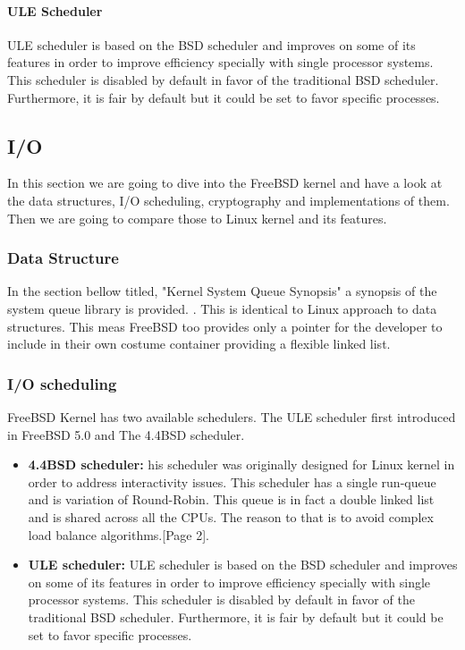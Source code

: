 \documentclass[journal,10pt,onecolumn,compsoc,letterpaper,draftclsnofoot,table,xcdraw]{IEEEtran} \usepackage[margin=0.75in]{geometry}
\begin{document}
\paragraph{ULE Scheduler} ULE scheduler is based on the BSD scheduler and improves on some of its features in order to improve efficiency specially with single processor systems. This scheduler is disabled by default in favor of the traditional BSD scheduler. Furthermore, it is fair by default but it could be set to favor specific processes.

\subsection{I/O}
\noindent In this section we are going to dive into the FreeBSD kernel and have a look at the data structures, I/O scheduling, cryptography and implementations of them. Then we are going to compare those to Linux kernel and its features.
\subsubsection{Data Structure}
\noindent In the section bellow titled, "Kernel System Queue Synopsis" a synopsis of the system queue library is provided. \cite{11}. This is identical to Linux approach to data structures. This meas FreeBSD too provides only a pointer for the developer to include in their own costume container providing a flexible linked list.
\subsubsection{I/O scheduling}
\noindent FreeBSD Kernel has two available schedulers. The ULE scheduler first introduced in FreeBSD 5.0 and The 4.4BSD scheduler.
\begin{itemize}
\item \textbf{4.4BSD scheduler:} his scheduler was originally designed for Linux kernel in order to address interactivity issues. This scheduler has a single run-queue and is variation of Round-Robin. This queue is in fact a double linked list and is shared across all the CPUs. The reason to that is to avoid complex load balance algorithms.\cite{freebsdpdf}[Page 2].
\item \textbf{ULE scheduler:} ULE scheduler is based on the BSD scheduler and improves on some of its features in order to improve efficiency specially with single processor systems. This scheduler is disabled by default in favor of the traditional BSD scheduler. Furthermore, it is fair by default but it could be set to favor specific processes.
\end{itemize}
\end{document}
